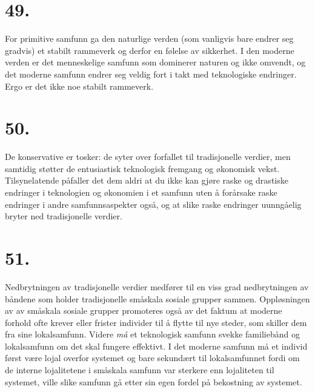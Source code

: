 \documentclass[oneside]{book}
\begin{document}
\section*{49.}
For primitive samfunn ga den naturlige verden (som vanligvis bare endrer seg
gradvis) et stabilt rammeverk og derfor en følelse av sikkerhet. I den moderne
verden er det menneskelige samfunn som dominerer naturen og ikke omvendt, og
det moderne samfunn endrer seg veldig fort i takt med teknologiske endringer.
Ergo er det ikke noe stabilt rammeverk.

\section*{50.}
De konservative er tosker: de syter over forfallet til tradisjonelle verdier,
men samtidig støtter de entusiastisk teknologisk fremgang og økonomisk vekst.
Tilsynelatende påfaller det dem aldri at du ikke kan gjøre raske og drastiske
endringer i teknologien og økonomien i et samfunn uten å forårsake raske
endringer i andre samfunnsaspekter også, og at slike raske endringer uunngåelig
bryter ned tradisjonelle verdier.

\section*{51.}
Nedbrytningen av tradisjonelle verdier medfører til en viss grad nedbrytningen
av båndene som holder tradisjonelle småskala sosiale grupper sammen.
Oppløsningen av av småskala sosiale grupper promoteres også av det faktum at
moderne forhold ofte krever eller frister individer til å flytte til nye
steder, som skiller dem fra sine lokalsamfunn. Videre \emph{må} et teknologisk
samfunn svekke familiebånd og lokalsamfunn om det skal fungere effektivt. I det
moderne samfunn må et individ først være lojal overfor systemet og bare
sekundært til lokalsamfunnet fordi om de interne lojalitetene i småskala
samfunn var sterkere enn lojaliteten til systemet, ville slike samfunn gå etter
sin egen fordel på bekostning av systemet. 
\end{document}
